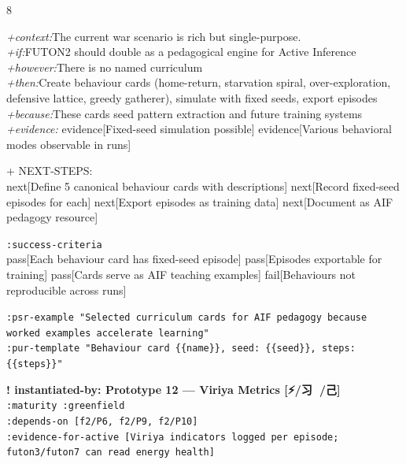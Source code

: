 \documentclass[landscape]{article}
\newcommand{\flexitag}[1]{\textcolor[gray]{0.35}{\textit{#1}}}
\newenvironment{devmapgreenfield}{%
  \def\FrameCommand{\colorbox{devmapgreenfieldbg}}%
  \setlength{\fboxsep}{2pt}%
  \MakeFramed{\advance\hsize-\width \FrameRestore}%
}{\endMakeFramed}
\begin{document}
\begin{paracol}{8}
\begin{devmapgreenfield}
  \flexitag{+context:}The current war scenario is rich but single-purpose.\\
  \flexitag{+if:}FUTON2 should double as a pedagogical engine for Active Inference\\
  \flexitag{+however:}There is no named curriculum\\
  \flexitag{+then:}Create behaviour cards (home-return, starvation spiral, over-exploration, defensive lattice, greedy gatherer), simulate with fixed seeds, export episodes\\
  \flexitag{+because:}These cards seed pattern extraction and future training systems\\
  \flexitag{+evidence:} evidence[Fixed-seed simulation possible] evidence[Various behavioral modes observable in runs]\\
\par
  + NEXT-STEPS:\\
    next[Define 5 canonical behaviour cards with descriptions] next[Record fixed-seed episodes for each] next[Export episodes as training data] next[Document as AIF pedagogy resource]\\
\par
  \texttt{:\allowbreak{}success-\allowbreak{}criteria}\\
    pass[Each behaviour card has fixed-seed episode] pass[Episodes exportable for training] pass[Cards serve as AIF teaching examples] fail[Behaviours not reproducible across runs]\\
\par
  \texttt{:\allowbreak{}psr-\allowbreak{}example "Selected curriculum cards for AIF pedagogy because worked examples accelerate learning"}\\
  \texttt{:\allowbreak{}pur-\allowbreak{}template "Behaviour card \{\{name\}\},\allowbreak{} seed:\allowbreak{} \{\{seed\}\},\allowbreak{} steps:\allowbreak{} \{\{steps\}\}"}\\
\par
\par
\end{devmapgreenfield}
\begin{devmapgreenfield}
\textbf{! instantiated-by: Prototype 12 — Viriya Metrics [⚡️/习 🐜/己]}\\
  \texttt{:\allowbreak{}maturity :\allowbreak{}greenfield}\\
  \texttt{:\allowbreak{}depends-\allowbreak{}on [f2/\allowbreak{}P6,\allowbreak{} f2/\allowbreak{}P9,\allowbreak{} f2/\allowbreak{}P10]}\\
  \texttt{:\allowbreak{}evidence-\allowbreak{}for-\allowbreak{}active [Viriya indicators logged per episode;\allowbreak{} futon3/\allowbreak{}futon7 can read energy health]}\\

\end{devmapgreenfield}
\end{paracol}
\end{document}
